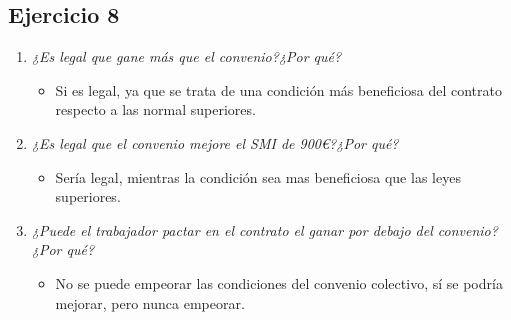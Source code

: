 \documentclass{article}
\begin{document}
      \subsection{Ejercicio 8}
        \begin{enumerate}[label=(\alph*)]
          \item \textit{¿Es legal que gane más que el convenio?¿Por qué?}
            \begin{itemize}
              \item Si es legal, ya que se trata de una condición más beneficiosa del contrato respecto a las normal superiores.
            \end{itemize}
          \item \textit{¿Es legal que el convenio mejore el SMI de 900€?¿Por qué?}
            \begin{itemize}
              \item Sería legal, mientras la condición sea mas beneficiosa que las leyes superiores.
            \end{itemize}
          \item \textit{¿Puede el trabajador pactar en el contrato el ganar por debajo del convenio?¿Por qué?}
            \begin{itemize}
              \item No se puede empeorar las condiciones del convenio colectivo, sí se podría mejorar, pero nunca empeorar.
            \end{itemize}
        \end{enumerate}

  \newpage
\end{document}
